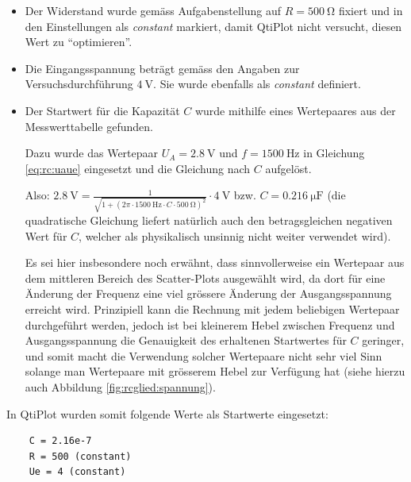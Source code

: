 \begin{itemize}
    \item
        Der   Widerstand   wurde   gem\"ass    Aufgabenstellung   auf   $R   =
        \SI{500}{\ohm}$ fixiert  und in den Einstellungen  als \emph{constant}
        markiert, damit QtiPlot nicht versucht, diesen Wert zu ``optimieren''.
    \item
        Die    Eingangsspannung   betr\"agt    gem\"ass   den    Angaben   zur
        Versuchsdurchf\"uhrung   $\SI{4}{\volt}$. Sie   wurde  ebenfalls   als
        \emph{constant} definiert.
    \item
        Der   Startwert  f\"ur   die  Kapazit\"at   $C$  wurde   mithilfe eines
        Wertepaares aus der Messwerttabelle gefunden.

        Dazu   wurde   das   Wertepaar   $U_A  =   \SI{2.8}{\volt}$   und   $f
        =   \SI{1500}{\hertz}$   in  Gleichung   \ref{eq:rc:uaue}   eingesetzt
        und   die  Gleichung   nach  $C$   aufgel\"ost.

        Also: $\SI{2.8}{\volt}       =      \frac{1}{\sqrt{1+(2\pi       \cdot
        \SI{1500}{\hertz}    \cdot   C    \cdot   \SI{500}{\ohm})^2}}    \cdot
        \SI{4}{\volt}$ bzw.  $C  = \SI{0.216}{\micro\farad}$ (die quadratische
        Gleichung liefert nat\"urlich auch  den betragsgleichen negativen Wert
        f\"ur $C$,  welcher als  physikalisch unsinnig nicht  weiter verwendet
        wird).

        Es  sei hier  insbesondere  noch erw\"ahnt,  dass sinnvollerweise  ein
        Wertepaar  aus dem  mittleren Bereich  des Scatter-Plots  ausgew\"ahlt
        wird, da dort f\"ur eine  \"Anderung der Frequenz eine viel gr\"ossere
        \"Anderung  der Ausgangsspannung  erreicht wird. Prinzipiell  kann die
        Rechnung mit jedem beliebigen  Wertepaar durchgef\"uhrt werden, jedoch
        ist  bei kleinerem  Hebel zwischen  Frequenz und  Ausgangsspannung die
        Genauigkeit des  erhaltenen Startwertes f\"ur $C$  geringer, und somit
        macht die Verwendung  solcher Wertepaare nicht sehr  viel Sinn solange
        man Wertepaare mit gr\"osserem Hebel zur Verf\"ugung hat (siehe hierzu
        auch Abbildung \ref{fig:rcglied:spannung}).
\end{itemize}

In QtiPlot wurden somit folgende Werte als Startwerte eingesetzt:

\begin{verbatim}
    C = 2.16e-7
    R = 500 (constant)
    Ue = 4 (constant)
\end{verbatim}

